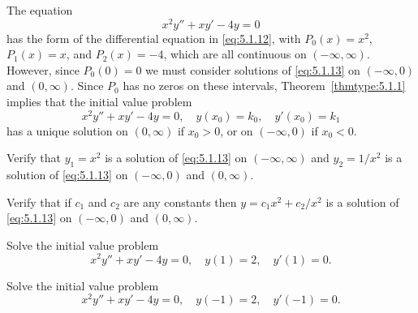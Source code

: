 \begin{example}
  \label{example:5.1.3} \rm The equation
  \begin{equation}
    \label{eq:5.1.13}x^{2}y''+xy'-4y=0
  \end{equation}
  has the form of the differential equation in \eqref{eq:5.1.12}, with $P_{0}(x)=x^{2}$,
  $P_{1}(x)=x$, and $P_{2}(x)=-4$, which are all continuous on $(-\infty,\infty)$. However, since
  $P_{0}(0)=0$ we must consider solutions of \eqref{eq:5.1.13} on $(-\infty,0)$ and $(0,\infty)$. Since
  $P_{0}$ has no zeros on these intervals, Theorem~\ref{thmtype:5.1.1} implies that the initial
  value problem
  \[
    x^{2}y''+xy'-4y=0,\quad y(x_{0})=k_{0},\quad y'(x_{0})=k_{1}
  \]
  has a unique solution on $(0,\infty)$ if $x_{0}>0$, or on $(-\infty,0)$ if $x_{0}<0$.
  \begin{alist}
    \item %
    Verify that $y_{1}=x^{2}$ is a solution of \eqref{eq:5.1.13} on $(-\infty,\infty)$ and
    $y_{2}=1/x^{2}$ is a solution of \eqref{eq:5.1.13} on $(-\infty,0)$ and $(0,\infty)$.

    \item %
    Verify that if $c_{1}$ and $c_{2}$ are any constants then $y=c_{1}x^{2}+c_{2}/x^{2}$ is a
    solution of \eqref{eq:5.1.13} on $(-\infty,0)$ and $(0,\infty)$.

    \item %
    Solve the initial value problem
    \begin{equation}
      \label{eq:5.1.14}x^{2}y''+xy'-4y=0,\quad y(1)=2,\quad y'(1)=0.
    \end{equation}

    \item %
    Solve the initial value problem
    \begin{equation}
      \label{eq:5.1.15}x^{2}y''+xy'-4y=0,\quad y(-1)=2,\quad y'(-1)=0.
    \end{equation}
  \end{alist}
\end{example}

